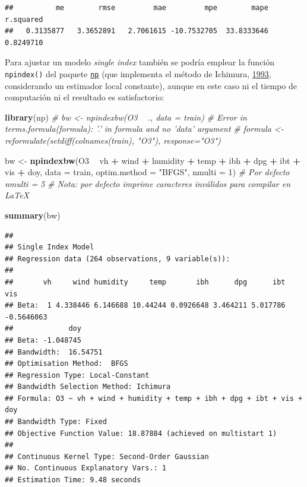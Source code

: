 \documentclass[
  spanish,
]{book}
\newenvironment{Shaded}{\begin{snugshade}}{\end{snugshade}}
\newcommand{\CommentTok}[1]{\textcolor[rgb]{0.56,0.35,0.01}{\textit{#1}}}
\newcommand{\DataTypeTok}[1]{\textcolor[rgb]{0.13,0.29,0.53}{#1}}
\newcommand{\DecValTok}[1]{\textcolor[rgb]{0.00,0.00,0.81}{#1}}
\newcommand{\KeywordTok}[1]{\textcolor[rgb]{0.13,0.29,0.53}{\textbf{#1}}}
\newcommand{\NormalTok}[1]{#1}
\newcommand{\OperatorTok}[1]{\textcolor[rgb]{0.81,0.36,0.00}{\textbf{#1}}}
\newcommand{\StringTok}[1]{\textcolor[rgb]{0.31,0.60,0.02}{#1}}
\theoremstyle{break}
\theoremstyle{definition}
\theoremstyle{definition}
\theoremstyle{definition}
\theoremstyle{remark}
\begin{document}
\begin{verbatim}
##          me        rmse         mae         mpe        mape   r.squared 
##   0.3135877   3.3652891   2.7061615 -10.7532705  33.8333646   0.8249710
\end{verbatim}

Para ajustar un modelo \emph{single index} también se podría emplear la función \texttt{npindex()} del paquete \href{https://github.com/JeffreyRacine/R-Package-np}{\texttt{np}} (que implementa el método de Ichimura, \protect\hyperlink{ref-ichimura1993}{1993}, considerando un estimador local constante), aunque en este caso ni el tiempo de computación ni el resultado es satisfactorio:

\begin{Shaded}
\begin{Highlighting}[]
\KeywordTok{library}\NormalTok{(np)}
\CommentTok{# bw <- npindexbw(O3 ~ ., data = train)}
\CommentTok{# Error in terms.formula(formula): '.' in formula and no 'data' argument}
\CommentTok{# formula <- reformulate(setdiff(colnames(train), "O3"), response="O3")}

\NormalTok{bw <-}\StringTok{ }\KeywordTok{npindexbw}\NormalTok{(O3 }\OperatorTok{~}\StringTok{ }\NormalTok{vh }\OperatorTok{+}\StringTok{ }\NormalTok{wind }\OperatorTok{+}\StringTok{ }\NormalTok{humidity }\OperatorTok{+}\StringTok{ }\NormalTok{temp }\OperatorTok{+}\StringTok{ }\NormalTok{ibh }\OperatorTok{+}\StringTok{ }\NormalTok{dpg }\OperatorTok{+}\StringTok{ }\NormalTok{ibt }\OperatorTok{+}\StringTok{ }\NormalTok{vis }\OperatorTok{+}\StringTok{ }\NormalTok{doy,}
                \DataTypeTok{data =}\NormalTok{ train, }\DataTypeTok{optim.method =} \StringTok{"BFGS"}\NormalTok{, }\DataTypeTok{nmulti =} \DecValTok{1}\NormalTok{) }\CommentTok{# Por defecto nmulti = 5}
\CommentTok{# Nota: por defecto imprime caracteres inválidos para compilar en LaTeX}
\end{Highlighting}
\end{Shaded}

\begin{Shaded}
\begin{Highlighting}[]
\KeywordTok{summary}\NormalTok{(bw)}
\end{Highlighting}
\end{Shaded}

\begin{verbatim}
## 
## Single Index Model
## Regression data (264 observations, 9 variable(s)):
## 
##       vh     wind humidity     temp       ibh      dpg      ibt        vis
## Beta:  1 4.338446 6.146688 10.44244 0.0926648 3.464211 5.017786 -0.5646063
##             doy
## Beta: -1.048745
## Bandwidth:  16.54751
## Optimisation Method:  BFGS
## Regression Type: Local-Constant
## Bandwidth Selection Method: Ichimura
## Formula: O3 ~ vh + wind + humidity + temp + ibh + dpg + ibt + vis + doy
## Bandwidth Type: Fixed
## Objective Function Value: 18.87884 (achieved on multistart 1)
## 
## Continuous Kernel Type: Second-Order Gaussian
## No. Continuous Explanatory Vars.: 1
## Estimation Time: 9.48 seconds
\end{verbatim}
\end{document}
